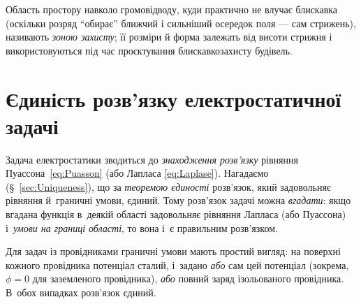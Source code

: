 Область простору навколо громовідводу, куди практично не влучає блискавка (оскільки
розряд \enquote{обирає} ближчий і сильніший осередок поля --- сам стрижень), називають
\emph{зоною захисту}; її розміри й форма залежать від висоти стрижня і використовуються
під час проєктування блискавкозахисту будівель.


\section{Єдиність розв'язку електростатичної задачі}\hypertarget{uniqueness-theorem}{}

Задача електростатики зводиться до \emph{знаходження розв'язку}
рівняння Пуассона~\eqref{eq:Puasson} (або Лапласа
\eqref{eq:Laplase}). Нагадаємо (\S~\ref{sec:Uniqueness}), що за \emph{теоремою єдиності}
розв'язок, який задовольняє рівняння й~граничні умови, єдиний. Тому розв'язок задачі можна
\emph{вгадати}: якщо вгадана функція в~деякій області задовольняє рівняння Лапласа (або
Пуассона) і~\emph{умови на границі області}, то вона і~є правильним розв'язком.

Для задач із провідниками граничні умови мають простий вигляд: на поверхні кожного
провідника потенціал сталий, і~задано \emph{або} сам цей потенціал (зокрема, $\phi = 0$ для
заземленого провідника), \emph{або} повний заряд ізольованого провідника. В~обох випадках
розв'язок єдиний.

